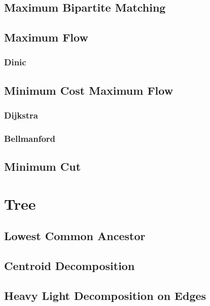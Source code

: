 \documentclass[10pt,a4paper]{report}
\begin{document}
		\subsection{Maximum Bipartite Matching}
			
		\newpage
		\subsection{Maximum Flow}
			\subsubsection{Dinic}
				
		\newpage
		\subsection{Minimum Cost Maximum Flow}
			\subsubsection{Dijkstra}
				
			\newpage
			\subsubsection{Bellmanford}
		\subsection{Minimum Cut}
		
	\section{Tree}
		\subsection{Lowest Common Ancestor}
			
		\newpage
		\subsection{Centroid Decomposition}
			
		\newpage
		\subsection{Heavy Light Decomposition on Edges}
			
\end{document}
